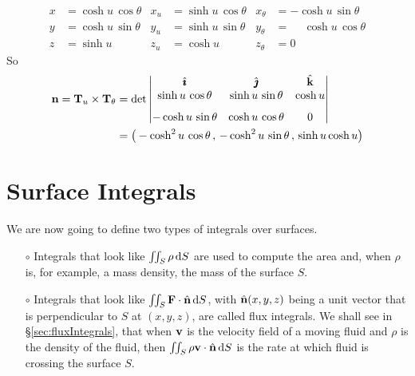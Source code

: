 \begin{eg}
\begin{align*}
x&=  \cosh u\,\cos\theta &
x_u&=  \sinh u\,\cos\theta &
x_\theta&=  -\cosh u\,\sin\theta \\
%
y&= \cosh u\,\sin\theta &
y_u&= \sinh u\,\sin\theta &
y_\theta&= \phantom{-}\cosh u\,\cos\theta \\
%
z&=\sinh u &
z_u&=\cosh u &
z_\theta&=0
\end{align*}
So
\begin{align*}
\mathbf{n} = \mathbf{T}_u\times\mathbf{T}_\theta
&=\det\left|\begin{matrix}
            \hat{\pmb{\imath}} &  \hat{\pmb{\jmath}} & \hat{\mathbf{k}} \\
            \sinh u\,\cos\theta &
               \sinh u\,\sin\theta &
               \cosh u \\[0.1in]
           -\cosh u\,\sin\theta  &
            \cosh u\,\cos\theta &
             0
           \end{matrix}\right| \\
&=\big(-\cosh^2u\,\cos\theta\,,\,
       -\cosh^2u\,\sin\theta\,,\,
       \sinh u\cosh u\big)
\end{align*}
\end{eg}


\section{Surface Integrals}\label{sec:surfaceIntegrals}

We are now going to define two types of integrals over surfaces.
\begin{itemize}
\item[$\circ$]
  Integrals that look like $\iint_S \rho\,\mathrm{d}S$ are used to
compute the area and, when $\rho$ is, for example, a mass density,
the mass of the surface $S$.
\item[$\circ$]
  Integrals that look like $\iint_S \mathbf{F}\cdot\hat{\mathbf{n}}\,\mathrm{d}S$,
with $\hat{\mathbf{n}}(x,y,z)$ being a unit vector that is perpendicular to 
$S$ at $(x,y,z)$,  are called
flux integrals. We shall see in \S\ref{sec:fluxIntegrals}, that when
$\mathbf{v}$ is the velocity field of a moving fluid and $\rho$ is the density
of the fluid, then $\iint_S \rho\mathbf{v}\cdot\hat{\mathbf{n}}\,\mathrm{d}S$ is the rate at which
fluid is crossing the surface $S$.
\end{itemize}

